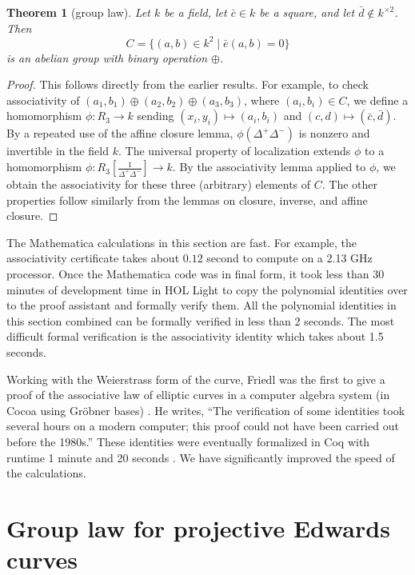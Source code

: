 \documentclass[12pt]{article}
\newtheorem{theorem}{Theorem}[subsection]
\newcommand{\f}[1]{\frac{1}{#1}}
\begin{document}
\begin{theorem}[group law]\label{thm:group} 
  Let $k$ be a field, let $\bar c \in k$ be a square, and let $\bar
  d\not\in k^{\times 2}$.  
  Then 
  \[
  C= \{(a,b)\in k^2 \mid \bar e(a,b) = 0\}
  \]
   is an abelian
  group with binary operation $\oplus$.
\end{theorem}

\begin{proof} This follows directly from the earlier results.  For
  example, to check associativity of $(a_1,b_1)\oplus (a_2,b_2) \oplus
  (a_3,b_3)$, where $(a_i,b_i)\in C$, we define a homomorphism
  $\phi:R_3\to k$ sending $(x_i,y_i)\mapsto (a_i,b_i)$ and
  $(c,d)\mapsto (\bar c,\bar d)$.  By a repeated use of the affine
  closure lemma, $\phi(\Delta^+\Delta^-)$ is nonzero and invertible in
  the field $k$.  The universal property of localization extends
  $\phi$ to a homomorphism $\phi:R_3[\f{\Delta^+\Delta^-}]\to k$.  By
  the associativity lemma applied to $\phi$, we obtain the
  associativity for these three (arbitrary) elements of $C$.  The
  other properties follow similarly from the lemmas on closure,
  inverse, and affine closure.
\end{proof}

The Mathematica calculations in this section are fast. For example,
the associativity certificate takes about $0.12$ second to compute on
a 2.13 GHz processor.  Once the Mathematica code was in final form, it
took less than 30 minutes of development time in HOL Light to copy the
polynomial identities over to the proof assistant and formally verify
them.  All the polynomial identities in this section combined can be
formally verified in less than 2 seconds. The most difficult formal
verification is the associativity identity which takes about 1.5
seconds.

Working with the Weierstrass form of the curve, Friedl was
the first to give a proof of the associative law of elliptic
curves in a computer algebra system (in Cocoa using Gr\"obner bases) \cite{friedl}. 
He writes, ``The verification of some identities took several hours
on a modern computer; this proof could not have been carried out
before the 1980s.''  These identities were eventually formalized in Coq
with runtime 1 minute and 20 seconds \cite{thery2007proving}.
We have significantly improved the speed of the calculations.

\section{Group law for projective Edwards curves}
\end{document}
